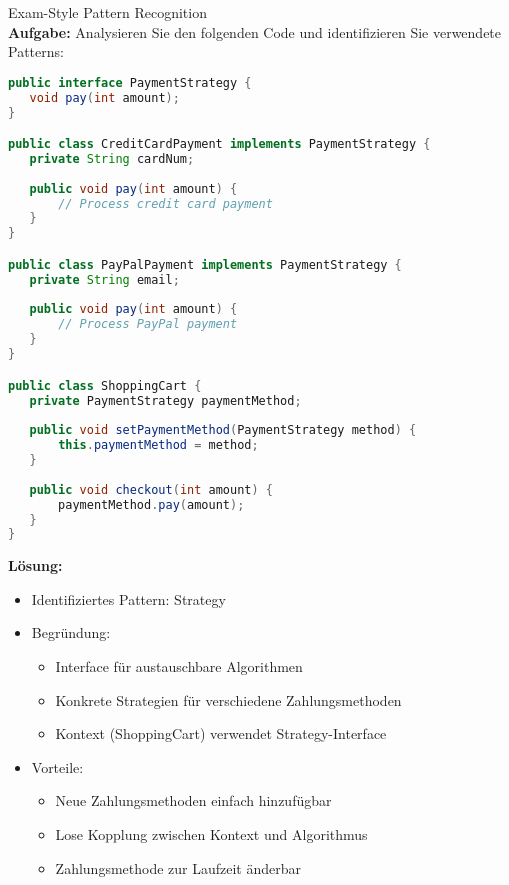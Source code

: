 \begin{example2}{Exam-Style Pattern Recognition}\\
\textbf{Aufgabe:} Analysieren Sie den folgenden Code und identifizieren Sie verwendete Patterns:

\begin{lstlisting}[language=Java, style=basesmol]
public interface PaymentStrategy {
   void pay(int amount);
}

public class CreditCardPayment implements PaymentStrategy {
   private String cardNum;
   
   public void pay(int amount) {
       // Process credit card payment
   }
}

public class PayPalPayment implements PaymentStrategy {
   private String email;
   
   public void pay(int amount) {
       // Process PayPal payment
   }
}

public class ShoppingCart {
   private PaymentStrategy paymentMethod;
   
   public void setPaymentMethod(PaymentStrategy method) {
       this.paymentMethod = method;
   }
   
   public void checkout(int amount) {
       paymentMethod.pay(amount);
   }
}
\end{lstlisting}

\textbf{Lösung:}
\begin{itemize}
   \item Identifiziertes Pattern: Strategy
   \item Begründung:
   \begin{itemize}
       \item Interface für austauschbare Algorithmen
       \item Konkrete Strategien für verschiedene Zahlungsmethoden
       \item Kontext (ShoppingCart) verwendet Strategy-Interface
   \end{itemize}
   \item Vorteile:
   \begin{itemize}
       \item Neue Zahlungsmethoden einfach hinzufügbar
       \item Lose Kopplung zwischen Kontext und Algorithmus
       \item Zahlungsmethode zur Laufzeit änderbar
   \end{itemize}
\end{itemize}
\end{example2}